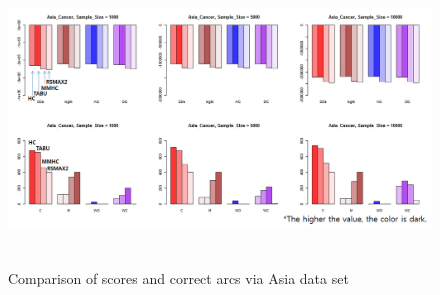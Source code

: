 	\begin{figure}[p]
	\centering
		\includegraphics[height=220pt]{images/Real_1_Asia}
		\caption{Comparison of scores and correct arcs via Asia data set}
	\end{figure}	